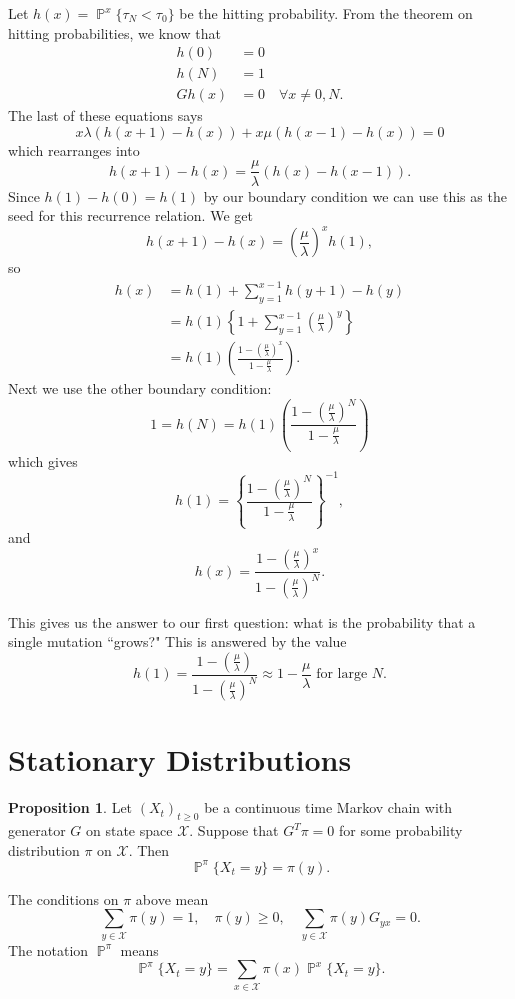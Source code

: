 \documentclass[../../../Master/AppliedStochastics.tex]{subfiles}
\theoremstyle{definition}
\newtheorem{prop}{Proposition}
\DeclareMathOperator{\p}{\mathbb{P}}
\begin{document}
Let $h(x) = \p^x\{\tau_N<\tau_0\}$ be the hitting probability. From the theorem on hitting probabilities, we know that 
\begin{align*}
	h(0) &= 0 \\
	h(N) &= 1\\
	Gh(x) &= 0 \quad \forall x\neq 0, N.
\end{align*}
The last of these equations says
\[
	x\lambda (h(x+1) - h(x)) + x \mu( h(x-1)-h(x)) = 0
\]
which rearranges into
\[
	h(x+1) - h(x) = \frac{\mu}{\lambda} (h(x) - h(x-1)).
\]
Since $h(1) - h(0) = h(1)$ by our boundary condition we can use this as the seed for this recurrence relation. We get
\[
	h(x+1) - h(x) = \left(\frac{\mu}{\lambda}\right)^x h(1),
\]
so
\begin{align*}
	h(x) &= h(1) + \sum_{y=1}^{x-1} h(y+1) - h(y)\\
	&= h(1)\left\{1 + \sum_{y=1}^{x-1} \left(\frac{\mu}{\lambda}\right)^y\right\}\\
	&= h(1) \left(\frac{1- \left(\frac{\mu}{\lambda}\right)^x}{1-\frac{\mu}{\lambda}}\right).
\end{align*}
Next we use the other boundary condition:
\[
	1 = h(N) = h(1)\left(\frac{1- \left(\frac{\mu}{\lambda}\right)^N}{1-\frac{\mu}{\lambda}}\right)
\]
which gives
\[
	h(1) =  \left\{\frac{1- \left(\frac{\mu}{\lambda}\right)^N}{1-\frac{\mu}{\lambda}}\right\}^{-1},
\]
and
\[
	h(x) = \frac{1- \left(\frac{\mu}{\lambda}\right)^x}{1 - \left(\frac{\mu}{\lambda}\right)^N} .
\]

This gives us the answer to our first question: what is the probability that a single mutation ``grows?" This is answered by the value 
\[
	h(1) =  \frac{1- \left(\frac{\mu}{\lambda}\right)}{1 - \left(\frac{\mu}{\lambda}\right)^N} \approx 1-\frac{\mu}{\lambda} \text{ for large }N.
\]

\section*{Stationary Distributions} 

\begin{prop}
Let $(X_t)_{t\geq 0}$ be a continuous time Markov chain with generator $G$ on state space $\mathcal{X}$. Suppose that $G^T \pi = 0$ for some probability distribution $\pi$ on $\mathcal{X}$. Then
\[
	\p^\pi\{X_t = y\} = \pi(y).
\]
\end{prop}

The conditions on $\pi$ above mean
\[
	\sum_{y\in \mathcal{X}} \pi(y) = 1, \quad \pi(y)\geq 0, \quad \sum_{y\in \mathcal{X}} \pi(y) G_{yx} = 0.
\]
The notation $\p^\pi$ means
\[
	\p^\pi\{X_t=y\} = \sum_{x\in\mathcal{X}} \pi(x) \p^x\{X_t=y\}.
\]
\end{document}
